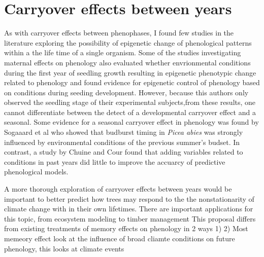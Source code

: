 \documentclass{article}\usepackage[]{graphicx}\usepackage[]{color}
\begin{document}
\section{Carryover effects between years}
\par As with carryover effects between phenophases, I found few studies in the literature exploring the possibility of epigenetic change of phenological patterns within a the life time of a single organism.
Some of the studies investigating maternal effects on phenology also evaluated whether envrionmental conditions during the first year of seedling growth resulting in epigenetic phenotypic change related to phenology \citep{Gomery2015} and found evidence for epigenetic control of phenology based on conditions during seeding development. However, because this authors only observed the seedling stage of their experimental subjects,from these results, one cannot differentiate between the detect of a developmental carryover effect and a seasonal. Some evidence for a seasonal carryover effect in phenology was found by Sogaaard et al \citeyear{Sogaard2008} who showed that  budburst timing in \textit{Picea abies} was strongly influenced by environmental conditions of the previous summer's budset. In contrast, a study by Chuine and Cour \citeyear{Chuine1999} found that adding variables related to conditions in past years did little to improve the accuarcy of predictive phenological models.
\par A more thorough exploration of carryover effects between years would be important to better predict how trees may respond to the the nonstationarity of climate change with in their own lifetimes. There are important applications for this topic, from ecosystem modeling to timber management 
This proposal differs from existing treatments of memory effects on phenology in 2 ways
1)
2) Most memeory effect look at the influence of broad cliamte conditions on future phenology, this looks at climate events








\end{document}

